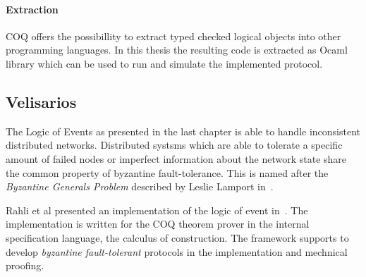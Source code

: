 
\paragraph{Extraction}
COQ offers the possibillity to extract typed checked logical objects into
other programming languages. In this thesis the resulting code is extracted
as Ocaml library which can be used to run and simulate the implemented
protocol.



\subsection{Velisarios}
The Logic of Events as presented in the last chapter is able to
handle inconsistent distributed networks. Distributed systsms which are
able to tolerate a specific amount of failed nodes or imperfect
information about the network state share the common property of
byzantine fault-tolerance. This is named after the \textit{Byzantine Generals
  Problem} described by Leslie Lamport in~\cite{}.





Rahli et al presented an implementation of the logic of event
in~\cite{rahli2018velisarios}. The implementation is written
for the COQ theorem prover in the internal specification language,
the calculus of construction. The framework supports to develop
\textit{byzantine fault-tolerant} protocols in the implementation
and mechnical proofing.~\cite{rahli2018velisarios}



